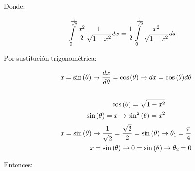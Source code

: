 \documentclass[11pt]{report}
\begin{document}
Donde:

\begin{align*}
        \int \limits_0^{\frac{1}{\sqrt{2}}} \frac{x^2}{2} \frac{1}{\sqrt{1 - x^2}} dx
        &= \frac{1}{2} \int \limits_0^{\frac{1}{\sqrt{2}}} \frac{x^2}{\sqrt{1 - x^2}} dx \notag
\end{align*}

Por sustitución trigonométrica:

\begin{align*}
        x = \sin{(\theta)} \rightarrow \frac{dx}{d\theta} = \cos{(\theta)}
        \rightarrow dx = \cos{(\theta)} d\theta \\ \notag
\end{align*}
\begin{align*}
        \cos{(\theta)} = \sqrt{1 - x^2} \\ \notag
        \sin{(\theta)} = x \rightarrow \sin^2{(\theta)} = x^2
\end{align*}
\begin{align*}
        x = \sin{(\theta)} \rightarrow \frac{1}{\sqrt{2}} = \frac{\sqrt{2}}{2} = \sin{(\theta)}
        \rightarrow \theta_1 = \frac{\pi}{4} \\ \notag
        x = \sin{(\theta)} \rightarrow 0 = \sin{(\theta)}
        \rightarrow \theta_2 = 0 \notag
\end{align*}

Entonces:
\end{document}
